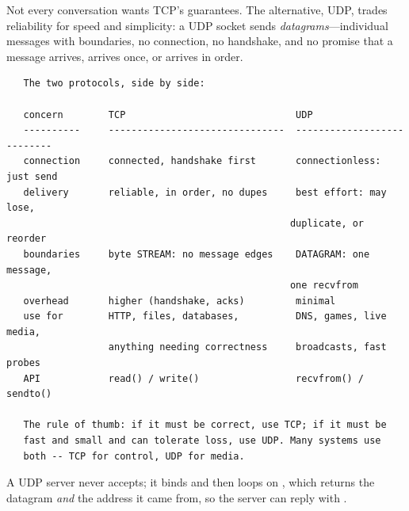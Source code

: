 Not every conversation wants TCP's guarantees. The alternative,
UDP, trades reliability for speed and simplicity: a UDP socket sends
\emph{datagrams}---individual messages with boundaries, no connection,
no handshake, and no promise that a message arrives, arrives once, or
arrives in order.

\begin{verbatim}
   The two protocols, side by side:

   concern        TCP                              UDP
   ----------     -------------------------------  ---------------------------
   connection     connected, handshake first       connectionless: just send
   delivery       reliable, in order, no dupes     best effort: may lose,
                                                  duplicate, or reorder
   boundaries     byte STREAM: no message edges    DATAGRAM: one message,
                                                  one recvfrom
   overhead       higher (handshake, acks)         minimal
   use for        HTTP, files, databases,          DNS, games, live media,
                  anything needing correctness     broadcasts, fast probes
   API            read() / write()                 recvfrom() / sendto()

   The rule of thumb: if it must be correct, use TCP; if it must be
   fast and small and can tolerate loss, use UDP. Many systems use
   both -- TCP for control, UDP for media.
\end{verbatim}

A UDP server never accepts; it binds and then loops on
, which returns the datagram \emph{and} the address it
came from, so the server can reply with .

